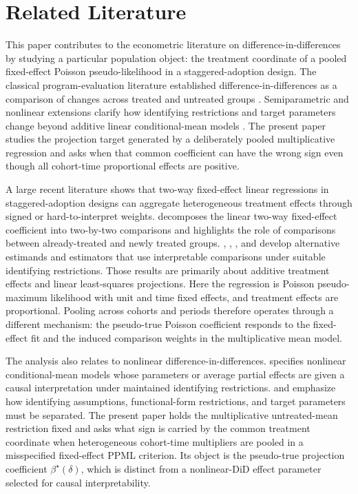 \section{Related Literature}

This paper contributes to the econometric literature on difference-in-differences by studying a particular population object: the treatment coordinate of a pooled fixed-effect Poisson pseudo-likelihood in a staggered-adoption design. The classical program-evaluation literature established difference-in-differences as a comparison of changes across treated and untreated groups \citep{AshenfelterCard1985,AngristPischke2009,ImbensWooldridge2009}. Semiparametric and nonlinear extensions clarify how identifying restrictions and target parameters change beyond additive linear conditional-mean models \citep{Abadie2005,AtheyImbens2006,SantAnnaZhao2020}. The present paper studies the projection target generated by a deliberately pooled multiplicative regression and asks when that common coefficient can have the wrong sign even though all cohort-time proportional effects are positive.

A large recent literature shows that two-way fixed-effect linear regressions in staggered-adoption designs can aggregate heterogeneous treatment effects through signed or hard-to-interpret weights. \citet{GoodmanBacon2021} decomposes the linear two-way fixed-effect coefficient into two-by-two comparisons and highlights the role of comparisons between already-treated and newly treated groups. \citet{deChaisemartinDHaultfoeuille2020TWFE}, \citet{CallawaySantAnna2021}, \citet{SunAbraham2021}, and \citet{BorusyakJaravelSpiess2024} develop alternative estimands and estimators that use interpretable comparisons under suitable identifying restrictions. Those results are primarily about additive treatment effects and linear least-squares projections. Here the regression is Poisson pseudo-maximum likelihood with unit and time fixed effects, and treatment effects are proportional. Pooling across cohorts and periods therefore operates through a different mechanism: the pseudo-true Poisson coefficient responds to the fixed-effect fit and the induced comparison weights in the multiplicative mean model.

The analysis also relates to nonlinear difference-in-differences. \citet{Wooldridge2023NonlinearDiD} specifies nonlinear conditional-mean models whose parameters or average partial effects are given a causal interpretation under maintained identifying restrictions. \citet{RothSantAnna2023} and \citet{RothSantAnnaBilinskiPoe2023} emphasize how identifying assumptions, functional-form restrictions, and target parameters must be separated. The present paper holds the multiplicative untreated-mean restriction fixed and asks what sign is carried by the common treatment coordinate when heterogeneous cohort-time multipliers are pooled in a misspecified fixed-effect PPML criterion. Its object is the pseudo-true projection coefficient \(\beta^\star(\delta)\), which is distinct from a nonlinear-DiD effect parameter selected for causal interpretability.


